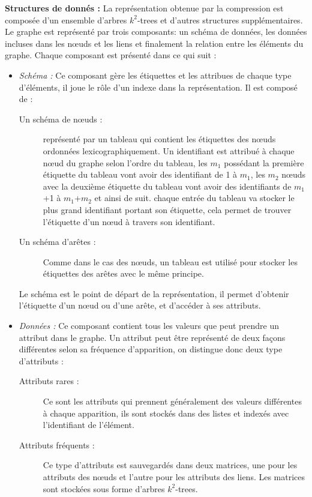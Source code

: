 \textbf{Structures de donnés :} La représentation obtenue par la compression est composée d'un ensemble d'arbres $k^2$-trees et d'autres structures supplémentaires. Le graphe est représenté par trois composants: un schéma de données, les données incluses dans les nœuds et les liens et finalement la relation entre les éléments du graphe. Chaque composant est présenté dans ce qui suit :
\begin{itemize}
\item \textit{Schéma : } Ce composant gère les étiquettes et les attribues de chaque type d'éléments, il joue le rôle d'un indexe dans la représentation. Il est composé de :
\begin{description}
\item[Un schéma de nœuds :] représenté par un tableau qui contient les étiquettes des nœuds ordonnées lexicographiquement. Un identifiant est attribué à chaque nœud du graphe selon l'ordre du tableau, les \textit{$m_1$} possédant la première étiquette du tableau vont avoir des identifiant de 1 à \textit{$m_1$}, les \textit{$m_2$} nœuds avec la deuxième étiquette du tableau vont avoir des identifiants de \textit{$m_1$}+1 à \textit{$m_1$}+\textit{$m_2$} et ainsi de suit. chaque entrée du tableau va stocker le plus grand identifiant portant son étiquette, cela permet de trouver l'étiquette d'un nœud à travers son identifiant.
\item[Un schéma d'arêtes :] Comme dans le cas des nœuds, un tableau est utilisé pour stocker les étiquettes des arêtes avec le même principe.  
\end{description}
Le schéma est le point de départ de la représentation, il permet d'obtenir l'étiquette d'un nœud ou d'une arête, et d'accéder à ses attributs.
\item \textit{Données :} Ce composant contient tous les valeurs que peut prendre un attribut dans le graphe. Un attribut peut être représenté de deux façons différentes selon sa fréquence d'apparition, on distingue donc deux type d'attributs :
\begin{description}
\item[Attributs rares :] Ce sont les attributs qui prennent généralement des valeurs différentes à chaque apparition, ils sont stockés dans des listes et indexés avec l'identifiant de l'élément.
\item[Attributs fréquents :] Ce type d'attributs est sauvegardés dans deux matrices, une pour les attributs des nœuds et l'autre pour les attributs des liens. Les matrices sont stockées sous forme d'arbres $k^2$-trees.

\end{description}
\end{itemize}
